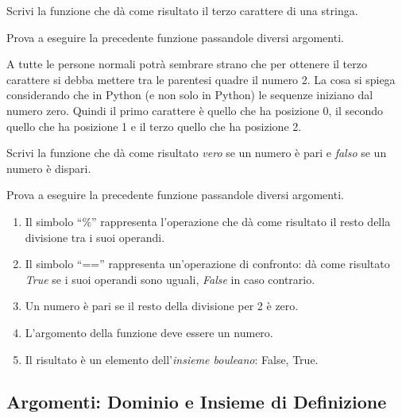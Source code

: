 \begin{esempio}
Scrivi la funzione che dà come risultato il terzo carattere di una 
stringa.


Prova a eseguire la precedente funzione passandole diversi argomenti.
\end{esempio}

\begin{osservazione}
A tutte le persone normali potrà sembrare strano che per ottenere il 
terzo carattere si debba mettere tra le parentesi quadre il numero 2. 
La cosa si spiega considerando che in Python (e non solo in Python) le 
sequenze iniziano dal numero zero. Quindi il primo carattere è quello che 
ha posizione 0, il secondo quello che ha posizione 1 e il terzo quello che 
ha posizione 2.
\end{osservazione}

\begin{esempio}
Scrivi la funzione che dà come risultato \emph{vero} se un numero è pari e 
\emph{falso} se un numero è dispari.


Prova a eseguire la precedente funzione passandole diversi argomenti.
\end{esempio}

\begin{osservazione}
\begin{enumerate} [nosep]
\item Il simbolo ``\%'' rappresenta l'operazione che dà come risultato il 
resto della divisione tra i suoi operandi.
\item Il simbolo ``=='' rappresenta un'operazione di confronto: 
dà come risultato \emph{True} se i suoi operandi sono uguali, \emph{False} 
in caso contrario.
\item Un numero è pari se il resto della divisione per 2 è zero.
\item L'argomento della funzione deve essere un numero.
\item Il risultato è un elemento dell'\emph{insieme bouleano}: {False, 
True}.
\end{enumerate}
\end{osservazione}

\subsection{Argomenti: Dominio e Insieme di Definizione}
\label{sec:funzioni2_dominio}

